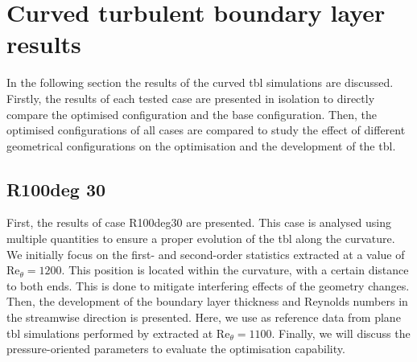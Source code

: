 \section{Curved turbulent boundary layer results}\label{sec:curvedResults}

In the following section the results of the curved \acrshort{tbl} simulations are discussed.
Firstly, the results of each tested case are presented in isolation to directly compare the optimised configuration and the base configuration.
Then, the optimised configurations of all cases are compared to study the effect of different geometrical configurations on the optimisation and the development of the \acrshort{tbl}.


\subsection{R100deg 30}\label{subsec:R100deg30}
First, the results of case R100deg30 are presented. 
This case is analysed using multiple quantities to ensure a proper evolution of the \acrshort{tbl} along the curvature.
We initially focus on the first- and second-order statistics extracted at a value of $\mathrm{Re}_{\theta} = 1200$. 
This position is located within the curvature, with a certain distance to both ends. 
This is done to mitigate interfering effects of the geometry changes.
Then, the development of the boundary layer thickness and Reynolds numbers in the streamwise direction is presented. 
Here, we use as reference data from plane \acrshort{tbl} simulations performed by \citet{jimenez_near-wall_2013} extracted at $\mathrm{Re}_{\theta} = 1100$.
Finally, we will discuss the pressure-oriented parameters to evaluate the optimisation capability. 


